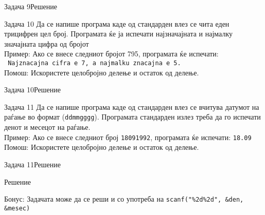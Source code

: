 \begin{frame}[fragile]{Задача 9}{Решение}
	
\end{frame}


\begin{frame}[fragile]{Задача 10}
Да се напише програма каде од стандарден влез се чита еден трицифрен цел број.
Програмата ќе ја испечати најзначајната и најмалку значајната цифра од бројот\\ 
Пример: Ако се внесе следниот бројот 795, програмата ќе испечати:\\
\texttt{	Najznacajna cifra e 7, a najmalku znacajna e 5.}\\
Помош: Искористете целобројно делење и остаток од делење.
\end{frame}

\begin{frame}[fragile]{Задача 10}{Решение}

\end{frame}


\begin{frame}[fragile]{Задача 11}
Да се напише програма каде од стандарден влез се вчитува датумот на раѓање во
формат (\texttt{ddmmgggg}). Програмата стандарден излез треба да го испечати
денот и месецот на раѓање.\\ Пример: Ако се внесе следниот број
\texttt{18091992}, програмата ќе испечати: \texttt{18.09}\\ Помош: Искористете целобројно делење и остаток од делење.
\end{frame}

\begin{frame}[fragile]{Задача 11}{Решение}
	\begin{exampleblock}{Решение}
		
	\end{exampleblock}
	Бонус: Задачата може да се реши и со употреба на \texttt{scanf("\%2d\%2d", \&den, \&mesec)}
\end{frame}
